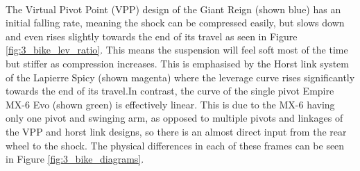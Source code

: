 		\\
		The Virtual Pivot Point (VPP) design of the Giant Reign (shown blue) has an initial falling rate, meaning the shock can be compressed easily, but slows down and even rises slightly towards the end of its travel as seen in Figure \ref{fig:3_bike_lev_ratio}. This means the suspension will feel soft most of the time but stiffer as compression increases. This is emphasised by the Horst link system of the Lapierre Spicy (shown magenta) where the leverage curve rises significantly towards the end of its travel.In contrast, the curve of the single pivot Empire MX-6 Evo (shown green) is effectively linear. This is due to the MX-6 having only one pivot and swinging arm, as opposed to multiple pivots and linkages of the VPP and horst link designs, so there is an almost direct input from the rear wheel to the shock. The physical differences in each of these frames can be seen in Figure \ref{fig:3_bike_diagrams}.
